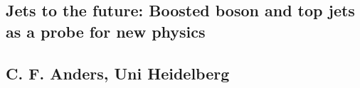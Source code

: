 \subsection*{Jets to the future: Boosted boson and top jets as a probe for new
  physics}
\subsection*{C. F. Anders, Uni Heidelberg}
\noindent
